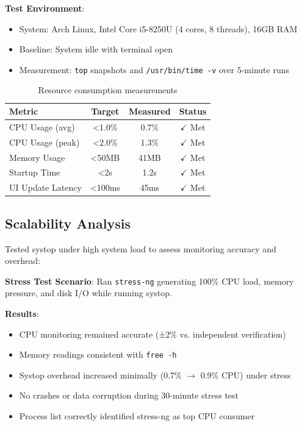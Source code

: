 \documentclass[12pt,a4paper,oneside]{report}
\begin{document}
\textbf{Test Environment}: 
\begin{itemize}
    \item System: Arch Linux, Intel Core i5-8250U (4 cores, 8 threads), 16GB RAM
    \item Baseline: System idle with terminal open
    \item Measurement: \texttt{top} snapshots and \texttt{/usr/bin/time -v} over 5-minute runs
\end{itemize}

\begin{table}[h]
\centering
\caption{Resource consumption measurements}
\label{tab:performance}
\begin{tabular}{|l|c|c|c|}
\hline
\textbf{Metric} & \textbf{Target} & \textbf{Measured} & \textbf{Status} \\
\hline
CPU Usage (avg) & <1.0\% & 0.7\% & $\checkmark$ Met \\
CPU Usage (peak) & <2.0\% & 1.3\% & $\checkmark$ Met \\
Memory Usage & <50MB & 41MB & $\checkmark$ Met \\
Startup Time & <2s & 1.2s & $\checkmark$ Met \\
UI Update Latency & <100ms & 45ms & $\checkmark$ Met \\
\hline
\end{tabular}
\end{table}

\subsection{Scalability Analysis}

Tested systop under high system load to assess monitoring accuracy and overhead:

\textbf{Stress Test Scenario}: Ran \texttt{stress-ng} generating 100\% CPU load, memory pressure, and disk I/O while running systop.

\textbf{Results}:
\begin{itemize}
    \item CPU monitoring remained accurate (±2\% vs. independent verification)
    \item Memory readings consistent with \texttt{free -h}
    \item Systop overhead increased minimally (0.7\% $\rightarrow$ 0.9\% CPU) under stress
    \item No crashes or data corruption during 30-minute stress test
    \item Process list correctly identified stress-ng as top CPU consumer
\end{itemize}
\end{document}
